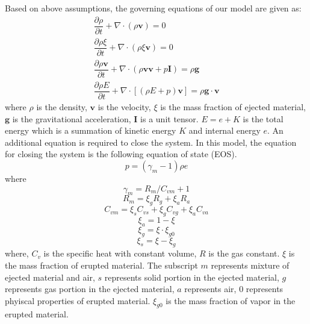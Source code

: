 \documentclass[utf8]{frontiersSCNS} %
\begin{document}
Based on above assumptions, the governing equations of our model are given as:
\begin{align}
\dfrac{\partial \rho}{\partial t} + \nabla \cdot \left(\rho \textbf{v}\right) = 0 \label{eq:gov-cs-rho} \\
\dfrac{\partial \rho \xi}{\partial t} + \nabla \cdot \left(\rho \xi \textbf{v}\right) = 0 \label{eq:gov-cs-ks}\\
\dfrac{\partial \rho \textbf{v}}{\partial t} + \nabla \cdot \left(\rho \textbf{v} \textbf{v} + p\textbf{I}\right) = \rho \textbf{g} \label{eq:gov-cs-v} \\
\dfrac{\partial \rho E}{\partial t} + \nabla \cdot \left[\left(\rho E + p \right)\textbf{v}\right] = \rho \textbf{g} \cdot\textbf{v} \label{eq:gov-cs-e}
\end{align}
where $\rho$ is the density, $\textbf{v}$ is the velocity, $\xi$ is the mass fraction of ejected material, $\textbf{g}$ is the gravitational acceleration, $\textbf{I}$ is a unit tensor.
$E = e + K $ is the total energy which is a summation of kinetic energy $K$ and internal energy $e$.
An additional equation is required to close the system. In this model, the equation for closing the system is the following equation of state (EOS).
\begin{equation}
p = \left(\gamma_m - 1\right)\rho e \label{eq:EOS}
\end{equation}
where
\begin{equation}
\gamma_m = R_m/C_{vm} + 1 \label{eq:gov-gm}
\end{equation}
\begin{equation}
R_m = \xi_g R_g + \xi_a R_a  \label{eq:gov-Rm}
\end{equation}
\begin{equation}
C_{vm} = \xi_s C_{vs} + \xi_g C_{vg} + \xi_a C_{va} \label{eq:gov-Cvm}
\end{equation}
\begin{equation}
\xi_a = 1 - \xi \label{eq:gov-na}
\end{equation}
\begin{equation}
\xi_g = \xi \cdot \xi_{g0} \label{eq:gov-ng}
\end{equation}
\begin{equation}
\xi_s = \xi - \xi_g \label{eq:gov-ns}
\end{equation}
where, $C_v$ is the specific heat with constant volume, $R$ is the gas constant. $\xi$ is the mass fraction of erupted material. The subscript $m$ represents mixture of ejected material and air, $s$ represents solid portion in the ejected material, $g$ represents gas portion in the ejected material, $a$ represents air, $0$ represents phyiscal properties of erupted material. $\xi_{g0}$ is the mass fraction of vapor in the erupted material.
\end{document}
